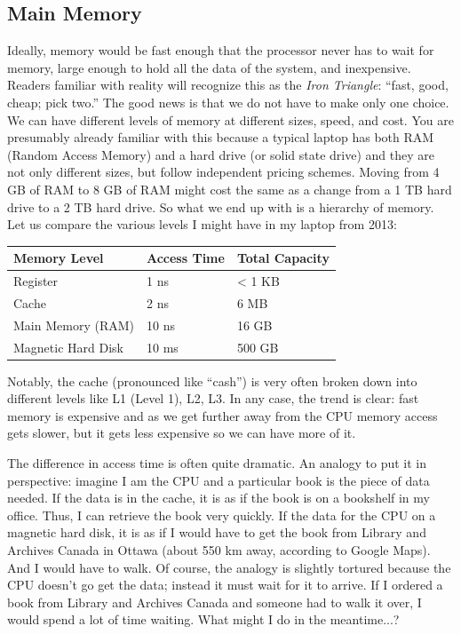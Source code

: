 \subsection*{Main Memory}
Ideally, memory would be fast enough that the processor never has to wait for memory, large enough to hold all the data of the system, and inexpensive. Readers familiar with reality will recognize this as the \textit{Iron Triangle}: ``fast, good, cheap; pick two.'' The good news is that we do not have to make only one choice. We can have different levels of memory at different sizes, speed, and cost. You are presumably already familiar with this because a typical laptop has both RAM (Random Access Memory) and a hard drive (or solid state drive) and they are not only different sizes, but follow independent pricing schemes. Moving from 4 GB of RAM to 8 GB of RAM might cost the same as a change from a 1 TB hard drive to a 2 TB hard drive. So what we end up with is a hierarchy of memory. Let us compare the various levels I might have in my laptop from 2013:

\begin{center}
	\begin{tabular}{l|l|l}
	\textbf{Memory Level} & \textbf{Access Time} & \textbf{Total Capacity} \\ \hline
	Register & 1 ns & < 1 KB \\
	Cache & 2 ns & 6 MB \\
	Main Memory (RAM) & 10 ns & 16 GB \\
	Magnetic Hard Disk & 10 ms & 500 GB \\
	\end{tabular}
\end{center}

Notably, the cache (pronounced like ``cash'') is very often broken down into different levels like L1 (Level 1), L2, L3. In any case, the trend is clear: fast memory is expensive and as we get further away from the CPU memory access gets slower, but it gets less expensive so we can have more of it. 

The difference in access time is often quite dramatic. An analogy to put it in perspective: imagine I am the CPU and a particular book is the piece of data needed. If the data is in the cache, it is as if the book is on a bookshelf in my office. Thus, I can retrieve the book very quickly. If the data for the CPU on a magnetic hard disk, it is as if I would have to get the book from Library and Archives Canada in Ottawa (about 550 km away, according to Google Maps). And I would have to walk. Of course, the analogy is slightly tortured because the CPU doesn't go get the data; instead it must wait for it to arrive. If I ordered a book from Library and Archives Canada and someone had to walk it over, I would spend a lot of time waiting. What might I do in the meantime...?

